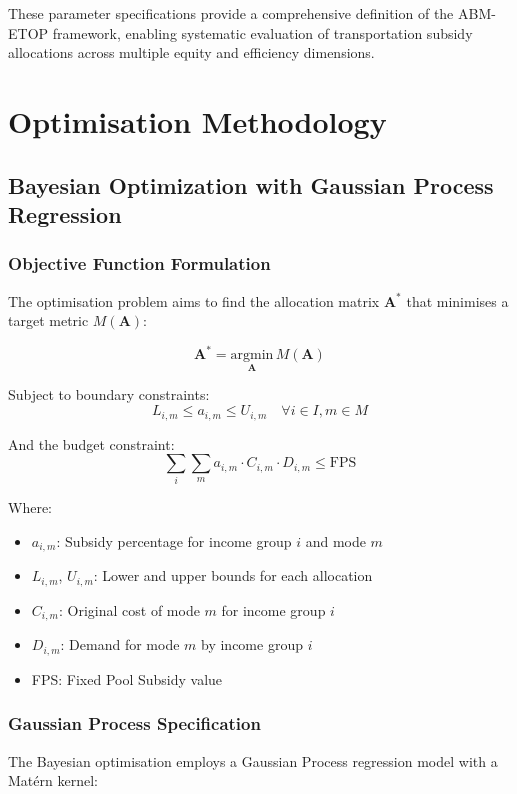 These parameter specifications provide a comprehensive definition of the ABM-ETOP framework, enabling systematic evaluation of transportation subsidy allocations across multiple equity and efficiency dimensions.

\section{Optimisation Methodology}
\label{app:optimization}

\subsection{Bayesian Optimization with Gaussian Process Regression}

\subsubsection{Objective Function Formulation}
The optimisation problem aims to find the allocation matrix $\mathbf{A}^*$ that minimises a target metric $M(\mathbf{A})$:

\begin{equation}
\mathbf{A}^* = \underset{\mathbf{A}}{\text{argmin}} \, M(\mathbf{A})
\end{equation}

Subject to boundary constraints:
\begin{equation}
L_{i,m} \leq a_{i,m} \leq U_{i,m} \quad \forall i \in I, m \in M
\end{equation}

And the budget constraint:
\begin{equation}
\sum_{i}\sum_{m} a_{i,m} \cdot C_{i,m} \cdot D_{i,m} \leq \text{FPS}
\end{equation}

Where:
\begin{itemize}
    \item $a_{i,m}$: Subsidy percentage for income group $i$ and mode $m$
    \item $L_{i,m}$, $U_{i,m}$: Lower and upper bounds for each allocation
    \item $C_{i,m}$: Original cost of mode $m$ for income group $i$
    \item $D_{i,m}$: Demand for mode $m$ by income group $i$
    \item FPS: Fixed Pool Subsidy value
\end{itemize}

\subsubsection{Gaussian Process Specification}
The Bayesian optimisation employs a Gaussian Process regression model with a Matérn kernel:

